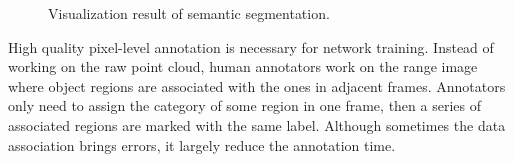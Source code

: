 \begin{figure}
	\centering
	\caption{Visualization result of semantic segmentation.}
	\label{fig:result_1}
\end{figure}	

High quality pixel-level annotation is necessary for network training. Instead of working on the raw point cloud, human annotators work on the range image where object regions are associated with the ones in adjacent frames. Annotators only need to assign the category of some region in one frame, then a series of associated regions are marked with the same label. Although sometimes the data association brings errors, it largely reduce the annotation time. 

